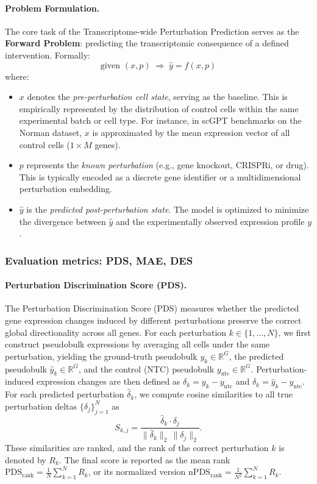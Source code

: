 \documentclass[conference]{IEEEtran}
\begin{document}
\paragraph{Problem Formulation.} The core task of the Transcriptome-wide Perturbation Prediction serves as the \textbf{Forward Problem}: predicting the transcriptomic consequence of a defined intervention. Formally:
\[
\text{given } (x, p) \;\Rightarrow\; \hat y = f(x, p)
\]
where:
\begin{itemize}
    \item $x$ denotes the \textit{pre-perturbation cell state}, serving as the baseline. This is empirically represented by the distribution of control cells within the same experimental batch or cell type. For instance, in scGPT benchmarks on the Norman dataset, $x$ is approximated by the mean expression vector of all control cells ($1 \times M$ genes).
    \item $p$ represents the \textit{known perturbation} (e.g., gene knockout, CRISPRi, or drug). This is typically encoded as a discrete gene identifier or a multidimensional perturbation embedding.
    \item $\hat{y}$ is the \textit{predicted post-perturbation state}. The model is optimized to minimize the divergence between $\hat{y}$ and the experimentally observed expression profile $y$.
\end{itemize}


\subsubsection{Evaluation metrics: PDS, MAE, DES}

\paragraph{Perturbation Discrimination Score (PDS).}
The Perturbation Discrimination Score (PDS) measures whether the predicted gene expression changes induced by different perturbations preserve the correct global directionality across all genes. For each perturbation $k \in \{1,\dots,N\}$, we first construct pseudobulk expressions by averaging all cells under the same perturbation, yielding the ground-truth pseudobulk $y_k \in \mathbb{R}^G$, the predicted pseudobulk $\hat y_k \in \mathbb{R}^G$, and the control (NTC) pseudobulk $y_{\mathrm{ntc}} \in \mathbb{R}^G$. Perturbation-induced expression changes are then defined as $\delta_k = y_k - y_{\mathrm{ntc}}$ and $\hat\delta_k = \hat y_k - y_{\mathrm{ntc}}$. For each predicted perturbation $\hat\delta_k$, we compute cosine similarities to all true perturbation deltas $\{\delta_j\}_{j=1}^N$ as
\[
S_{k,j} = \frac{\hat\delta_k \cdot \delta_j}{\|\hat\delta_k\|_2 \, \|\delta_j\|_2}.
\]
These similarities are ranked, and the rank of the correct perturbation $k$ is denoted by $R_k$. The final score is reported as the mean rank $\mathrm{PDS}_{\mathrm{rank}} = \frac{1}{N}\sum_{k=1}^N R_k$, or its normalized version $\mathrm{nPDS}_{\mathrm{rank}} = \frac{1}{N^2}\sum_{k=1}^N R_k$.
\end{document}
